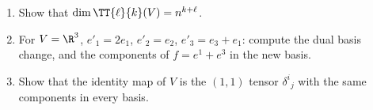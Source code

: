 \begin{exercises}
\begin{enumerate}[nosep]
\item Show that $\dim\TT{\ell}{k}(V)=n^{k+\ell}$.
\item For $V=\R^3$, $e'_1=2e_1$, $e'_2=e_2$, $e'_3=e_3+e_1$: compute the dual basis change, and the components of $f=e^{1}+e^{3}$ in the new basis.
\item Show that the identity map of $V$ is the $(1,1)$ tensor $\delta^i{}_j$ with the same components in every basis.
\end{enumerate}
\end{exercises}
